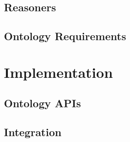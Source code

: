 \documentclass[12pt]{article}
\begin{document}
\subsection{Reasoners}


\subsection{Ontology Requirements}


\newpage
\section{Implementation}

\subsection{Ontology APIs}


\subsection{Integration}


\newpage

%
\newpage
%

\nocite{*}

\end{document}
